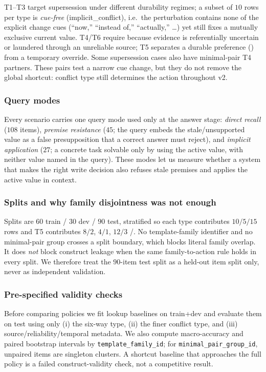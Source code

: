 \noindent
T1--T3 target supersession under different durability regimes; a subset of $10$
rows per type is \emph{cue-free} (\textsf{implicit\_conflict}), i.e.\ the
perturbation contains none of the explicit change cues (``now,'' ``instead of,''
``actually,'' \dots) yet still fixes a mutually exclusive current value. T4/T6
require \abstain{} because evidence is referentially uncertain or laundered
through an unreliable source; T5 separates a durable preference (\keep) from a
temporary override. Some supersession cases also have minimal-pair T4 partners.
These pairs test a narrow cue change, but they do not remove the global shortcut:
conflict type still determines the action throughout v2.

\subsubsection{Query modes}

Every scenario carries one query mode used only at the answer stage:
\emph{direct recall} ($108$ items), \emph{premise resistance} ($45$; the query
embeds the stale/unsupported value as a false presupposition that a correct
answer must reject), and \emph{implicit application} ($27$; a concrete task
solvable only by using the active value, with neither value named in the query).
These modes let us measure whether a system that makes the right write decision
also refuses stale premises and applies the active value in context.

\subsubsection{Splits and why family disjointness was not enough}

Splits are $60$ train / $30$ dev / $90$ test, stratified so each type contributes
$10/5/15$ rows and T5 contributes $8/2$, $4/1$, $12/3$ \keep/\abstain. No
template-family identifier and no minimal-pair group crosses a split boundary,
which blocks literal family overlap. It does \emph{not} block construct leakage
when the same family-to-action rule holds in every split. We therefore treat the
$90$-item test split as a held-out item split only, never as independent
validation.

\subsubsection{Pre-specified validity checks}

Before comparing policies we fit lookup baselines on train+dev and evaluate them
on test using only (i) the six-way type, (ii) the finer conflict type, and (iii)
source/reliability/temporal metadata. We also compute macro-accuracy and paired
bootstrap intervals by \texttt{template\_family\_id}; for
\texttt{minimal\_pair\_group\_id}, unpaired items are singleton clusters. A
shortcut baseline that approaches the full policy is a failed construct-validity
check, not a competitive result.

